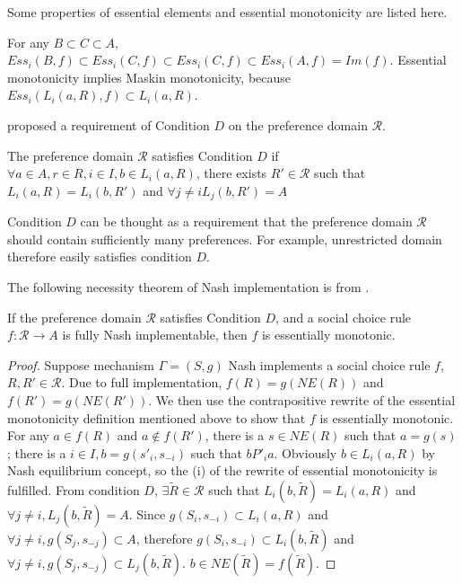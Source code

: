 \begin{remark}
Some properties of essential elements and essential monotonicity are
listed here. 

For any $ B \subset C \subset A$,  $Ess_i(B,f) \subset Ess_i(C,f)
\subset Ess_i(C,f) \subset Ess_i(A,f) = Im(f)$. Essential monotonicity
implies Maskin monotonicity, because $Ess_i(L_i(a, R), f) \subset L_i(a,R)$.
\end{remark}


\parencite{Yamato1992} proposed a requirement of Condition $D$ on the preference
domain $\mathscr{R}$.

\begin{definition*}
The preference domain $\mathscr{R}$ satisfies Condition $D$ if
$\forall a \in A, r \in R, i \in I, b \in L_i(a, R)$, there exists $R'
\in \mathscr{R}$ such that $L_i(a,R) = L_i(b, R')$ and $\forall j \not
= i  L_j(b,R')=A$
\end{definition*}

Condition $D$ can be thought as a requirement that the preference
domain $\mathscr{R}$ should contain sufficiently many
preferences. For example, unrestricted domain therefore easily
satisfies condition $D$.

The following necessity theorem of Nash implementation is
from \parencite{Yamato1992}.

\begin{thm*}
If the preference domain $\mathscr{R}$ satisfies Condition $D$, and
a social choice rule $f :\mathscr{R} \rightarrow A$ is fully Nash
implementable, then $f$ is essentially monotonic.

\end{thm*}

\begin{proof}
Suppose mechanism $\Gamma=(S,g)$ Nash implements a  social choice rule
$f$, $R, R' \in \mathscr{R}$. Due to full implementation, $f(R)=
g(NE(R))$ and $f(R')= g(NE(R'))$. We then use  the contrapositive rewrite of
the essential monotonicity definition mentioned above to show that $f$
is essentially monotonic. For any $a \in f(R)$ and $a \not \in f(R')$,
there is a $ s \in NE(R)$ such that $a =g(s)$ ; there is a $i \in I, b
= g(s'_i, s_{-i})$ such that  $ b P'_i a$. Obviously  $b \in L_i(a,
R)$ by Nash equilibrium concept, so the (i) of the rewrite
of essential monotonicity is fulfilled. From condition $D$, $\exists
\tilde{R} \in \mathscr{R}$ such that $L_i(b, \tilde{R})=L_i(a,R)$
and $\forall j \not = i, L_j(b, \tilde{R})=A$. Since $g(S_i, s_{-i})
\subset L_i(a,R) $ and $\forall j\not = i, g(S_j, s_{-j}) \subset A$, therefore $g(S_i, s_{-i})
\subset L_i(b, \tilde{R}) $ and $\forall j \not = i, g(S_j, s_{-j})
\subset L_j(b, \tilde{R})$. $b \in NE(\tilde{R}) = f(\tilde{R})$.
\end{proof}


